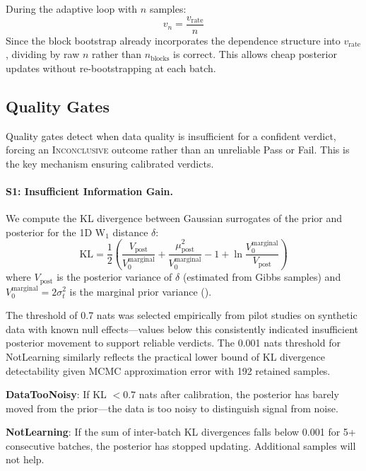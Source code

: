 \documentclass[letterpaper,twocolumn,10pt]{article}
\begin{document}
During the adaptive loop with $n$ samples:
\begin{equation}
v_n = \frac{v_{\text{rate}}}{n}
\end{equation}
Since the block bootstrap already incorporates the dependence structure into
$v_{\text{rate}}$, dividing by raw $n$ rather than $n_{\text{blocks}}$ is correct.
This allows cheap posterior updates without re-bootstrapping at each batch.

\subsection{Quality Gates}
\label{app:gates}

Quality gates detect when data quality is insufficient for a confident verdict, forcing an \textsc{Inconclusive} outcome rather than an unreliable Pass or Fail. This is the key mechanism ensuring calibrated verdicts.

\paragraph{S1: Insufficient Information Gain.}
We compute the KL divergence between Gaussian surrogates of the prior and posterior
for the 1D W$_1$ distance $\delta$:
\begin{equation}
\mathrm{KL} = \frac{1}{2}\left(
\frac{V_{\text{post}}}{V_0^{\text{marginal}}}
+ \frac{\mu_{\text{post}}^2}{V_0^{\text{marginal}}}
- 1 + \ln\frac{V_0^{\text{marginal}}}{V_{\text{post}}}
\right)
\end{equation}
where $V_{\text{post}}$ is the posterior variance of $\delta$ (estimated from Gibbs samples)
and $V_0^{\text{marginal}} = 2\sigma_t^2$ is the marginal prior variance ().

The threshold of 0.7 nats was selected empirically from pilot studies on synthetic data with known null effects—values below this consistently indicated insufficient posterior movement to support reliable verdicts. The 0.001 nats threshold for NotLearning similarly reflects the practical lower bound of KL divergence detectability given MCMC approximation error with 192 retained samples.

\textbf{DataTooNoisy}: If KL $< 0.7$ nats after calibration, the posterior has barely moved from the prior---the data is too noisy to distinguish signal from noise.

\textbf{NotLearning}: If the sum of inter-batch KL divergences falls below 0.001 for 5+ consecutive batches, the posterior has stopped updating. Additional samples will not help.
\end{document}
